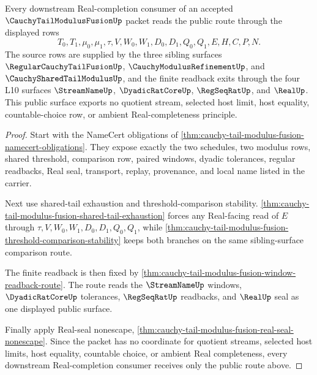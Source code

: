 \begin{theorem}
\label{thm:cauchy-tail-modulus-fusion-public-real-completion-export}
Every downstream Real-completion consumer of an accepted $\CauchyTailModulusFusionUp$ packet reads the public route through the displayed rows
$$
T_0,T_1,\mu_0,\mu_1,\tau,V,W_0,W_1,D_0,D_1,Q_0,Q_1,E,H,C,P,N.
$$
The source rows are supplied by the three sibling surfaces $\RegularCauchyTailFusionUp$, $\CauchyModulusRefinementUp$, and $\CauchySharedTailModulusUp$, and the finite readback exits through the four L10 surfaces $\StreamNameUp$, $\DyadicRatCoreUp$, $\RegSeqRatUp$, and $\RealUp$. This public surface exports no quotient stream, selected host limit, host equality, countable-choice row, or ambient Real-completeness principle.
\end{theorem}
\begin{proof}
Start with the NameCert obligations of \autoref{thm:cauchy-tail-modulus-fusion-namecert-obligations}. They expose exactly the two schedules, two modulus rows, shared threshold, comparison row, paired windows, dyadic tolerances, regular readbacks, Real seal, transport, replay, provenance, and local name listed in the carrier.

Next use shared-tail exhaustion and threshold-comparison stability. \autoref{thm:cauchy-tail-modulus-fusion-shared-tail-exhaustion} forces any Real-facing read of $E$ through $\tau,V,W_0,W_1,D_0,D_1,Q_0,Q_1$, while \autoref{thm:cauchy-tail-modulus-fusion-threshold-comparison-stability} keeps both branches on the same sibling-surface comparison route.

The finite readback is then fixed by \autoref{thm:cauchy-tail-modulus-fusion-window-readback-route}. The route reads the $\StreamNameUp$ windows, $\DyadicRatCoreUp$ tolerances, $\RegSeqRatUp$ readbacks, and $\RealUp$ seal as one displayed public surface.

Finally apply Real-seal nonescape, \autoref{thm:cauchy-tail-modulus-fusion-real-seal-nonescape}. Since the packet has no coordinate for quotient streams, selected host limits, host equality, countable choice, or ambient Real completeness, every downstream Real-completion consumer receives only the public route above.
\end{proof}

